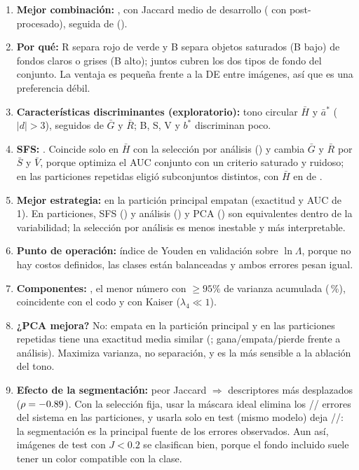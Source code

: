 \documentclass[11pt,a4paper]{article}
\begin{document}
\begin{enumerate}[leftmargin=1.6em,itemsep=2pt]
\item \textbf{Mejor combinación:} \BestCombo, con Jaccard medio de desarrollo \BestDevJ{}
(\BestDevPostJ{} con post-procesado), seguida de \SecondCombo{} (\SecondDevJ).
\item \textbf{Por qué:} R separa rojo de verde y B separa objetos saturados (B bajo) de
fondos claros o grises (B alto); juntos cubren los dos tipos de fondo del conjunto. La
ventaja es pequeña frente a la DE entre imágenes, así que es una preferencia débil.
\item \textbf{Características discriminantes (exploratorio):} tono circular $\bar H$ y
$\bar a^*$ ($|d|>3$), seguidos de $\bar G$ y $\bar R$; B, S, V y $b^*$ discriminan poco.
\item \textbf{SFS:} \SFSFeatures. Coincide solo en $\bar H$ con la selección por
análisis (\AnalysisFeatures) y cambia $\bar G$ y $\bar R$ por $\bar S$ y $\bar V$, porque optimiza
el AUC conjunto con un criterio saturado y ruidoso; en las particiones repetidas eligió
\SfsDistinctSubsets{} subconjuntos distintos, con $\bar H$ en \SfsWithHCount{} de \NRepeats.
\item \textbf{Mejor estrategia:} en la partición principal empatan (exactitud y AUC de 1). En
\NRepeats{} particiones, SFS (\SfsRepKmAcc) y análisis (\AnRepKmAcc) y PCA (\PcaRepKmAcc) son
equivalentes dentro de la variabilidad; la selección por análisis es menos inestable y más
interpretable.
\item \textbf{Punto de operación:} índice de Youden en validación sobre $\ln\Lambda$, porque no
hay costos definidos, las clases están balanceadas y ambos errores pesan igual.
\item \textbf{Componentes:} \PCAn, el menor número con $\ge95\%$ de varianza acumulada
(\PCAcum\,\%), coincidente con el codo y con Kaiser ($\lambda_4\ll1$).
\item \textbf{¿PCA mejora?} No: empata en la partición principal y en las particiones
repetidas tiene una exactitud media similar (\PcaRepKmAcc; gana/empata/pierde \PcaVsAn{} frente
a análisis). Maximiza varianza, no separación, y es la más sensible a la ablación del tono.
\item \textbf{Efecto de la segmentación:} peor Jaccard $\Rightarrow$ descriptores más desplazados
($\rho=-0.89$). Con la selección fija, usar la máscara ideal elimina los
\AnRepKmErr/\SfsRepKmErr/\PcaRepKmErr{} errores del sistema en las \NRepeats{} particiones, y
usarla solo en test (mismo modelo) deja \AnRepSwapErr/\SfsRepSwapErr/\PcaRepSwapErr: la
segmentación es la principal fuente de los errores observados. Aun así, \TestLowJCorrect{}
imágenes de test con $J<0.2$ se clasifican bien, porque el fondo incluido suele tener un color
compatible con la clase.
\end{enumerate}
\end{document}

